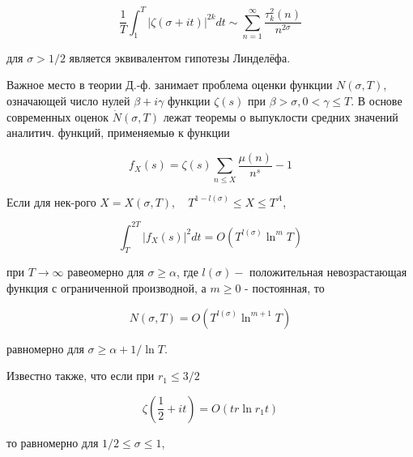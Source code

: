 \documentclass[10pt]{article}
\begin{document}
\[

\frac{1}{T} \int_{1}^{T}|\zeta(\sigma+i t)|^{2 k} d t \sim \sum_{n=1}^{\infty} \frac{\tau_{k}^{2}(n)}{n^{2 \sigma}}

\]



для $\sigma>1 / 2$ является эквивалентом гипотезы Линделёфа.



Важное место в теории Д.-ф. занимает проблема оценки функции $N(\sigma, T)$, означающей число нулей $\beta+i \gamma$ функции $\zeta(s)$ при $\beta>\sigma, 0<\gamma \leqslant T$. В основе современных оценок $\dot{N}(\sigma, T)$ лежат теоремы о выпуклости средних значений аналитич. функций, применяемыө к функции



\[

f_{X}(s)=\zeta(s) \sum_{n \leqslant X} \frac{\mu(n)}{n^{s}}-1

\]



Если для нек-рого $X=X(\sigma, T), \quad T^{1-l(\sigma)} \leqslant X \leqslant T^{A}$,



\[

\int_{T}^{2 T}\left|f_{X}(s)\right|^{2} d t=O\left(T^{l(\sigma)} \ln ^{m} T\right)

\]



при $T \rightarrow \infty$ равеомерно для $\sigma \geqslant \alpha$, где $l(\sigma)-$ положительная невозрастающая функция с ограниченной производной, а $m \geqslant 0$ - постоянная, то



\[

N(\sigma, T)=O\left(T^{l(\sigma)} \ln ^{m+1} T\right)

\]



равномерно для $\sigma \geqslant \alpha+1 / \ln T$.



Известно также, что если при $r_{1} \leqslant 3 / 2$



\[

\zeta\left(\frac{1}{2}+i t\right)=O\left(t r \ln r_{1} t\right)

\]



то равномерно для $1 / 2 \leqslant \sigma \leqslant 1$,
\end{document}
